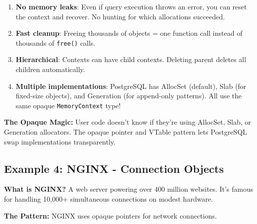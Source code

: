 \begin{enumerate}
    \item \textbf{No memory leaks}: Even if query execution throws an error, you can reset the context and recover. No hunting for which allocations succeeded.

    \item \textbf{Fast cleanup}: Freeing thousands of objects = one function call instead of thousands of \texttt{free()} calls.

    \item \textbf{Hierarchical}: Contexts can have child contexts. Deleting parent deletes all children automatically.

    \item \textbf{Multiple implementations}: PostgreSQL has AllocSet (default), Slab (for fixed-size objects), and Generation (for append-only patterns). All use the same opaque \texttt{MemoryContext} type!
\end{enumerate}

\textbf{The Opaque Magic:} User code doesn't know if they're using AllocSet, Slab, or Generation allocators. The opaque pointer and VTable pattern lets PostgreSQL swap implementations transparently.

\subsection{Example 4: NGINX - Connection Objects}

\textbf{What is NGINX?} A web server powering over 400 million websites. It's famous for handling 10,000+ simultaneous connections on modest hardware.

\textbf{The Pattern:} NGINX uses opaque pointers for network connections.

